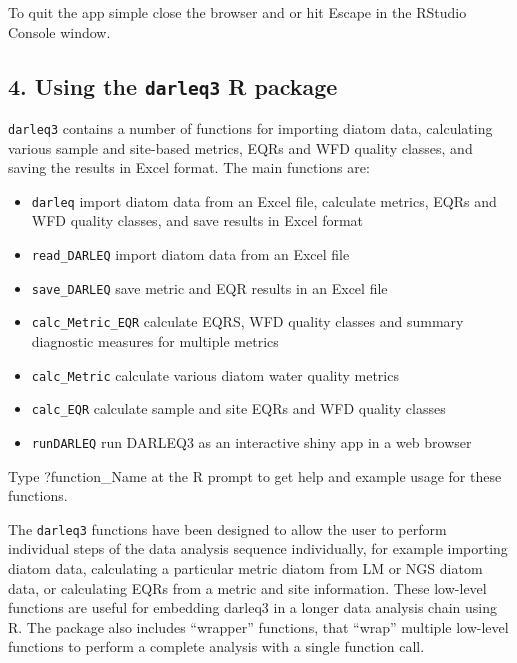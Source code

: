 \documentclass[
]{article}
\providecommand{\tightlist}{%
  \setlength{\itemsep}{0pt}\setlength{\parskip}{0pt}}
\begin{document}
To quit the app simple close the browser and or hit Escape in the
RStudio Console window.

\hypertarget{using-the-darleq3-r-package}{%
\subsection{\texorpdfstring{4. Using the \texttt{darleq3} R
package}{4. Using the darleq3 R package}}\label{using-the-darleq3-r-package}}

\texttt{darleq3} contains a number of functions for importing diatom
data, calculating various sample and site-based metrics, EQRs and WFD
quality classes, and saving the results in Excel format. The main
functions are:

\begin{itemize}
\tightlist
\item
  \texttt{darleq} import diatom data from an Excel file, calculate
  metrics, EQRs and WFD quality classes, and save results in Excel
  format
\item
  \texttt{read\_DARLEQ} import diatom data from an Excel file
\item
  \texttt{save\_DARLEQ} save metric and EQR results in an Excel file
\item
  \texttt{calc\_Metric\_EQR} calculate EQRS, WFD quality classes and
  summary diagnostic measures for multiple metrics
\item
  \texttt{calc\_Metric} calculate various diatom water quality metrics
\item
  \texttt{calc\_EQR} calculate sample and site EQRs and WFD quality
  classes
\item
  \texttt{runDARLEQ} run DARLEQ3 as an interactive shiny app in a web
  browser
\end{itemize}

Type ?function\_Name at the R prompt to get help and example usage for
these functions.

The \texttt{darleq3} functions have been designed to allow the user to
perform individual steps of the data analysis sequence individually, for
example importing diatom data, calculating a particular metric diatom
from LM or NGS diatom data, or calculating EQRs from a metric and site
information. These low-level functions are useful for embedding darleq3
in a longer data analysis chain using R. The package also includes
``wrapper'' functions, that ``wrap'' multiple low-level functions to
perform a complete analysis with a single function call.
\end{document}
